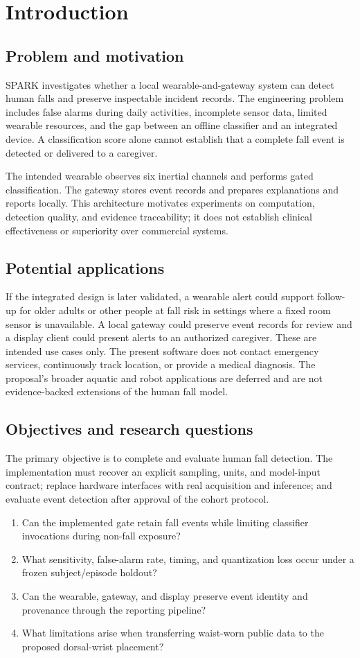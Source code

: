 \chapter{Introduction}
\section{Problem and motivation}
SPARK investigates whether a local wearable-and-gateway system can detect human falls and preserve inspectable incident records. The engineering problem includes false alarms during daily activities, incomplete sensor data, limited wearable resources, and the gap between an offline classifier and an integrated device. A classification score alone cannot establish that a complete fall event is detected or delivered to a caregiver.

The intended wearable observes six inertial channels and performs gated classification. The gateway stores event records and prepares explanations and reports locally. This architecture motivates experiments on computation, detection quality, and evidence traceability; it does not establish clinical effectiveness or superiority over commercial systems.

\section{Potential applications}
If the integrated design is later validated, a wearable alert could support follow-up for older adults or other people at fall risk in settings where a fixed room sensor is unavailable. A local gateway could preserve event records for review and a display client could present alerts to an authorized caregiver. These are intended use cases only. The present software does not contact emergency services, continuously track location, or provide a medical diagnosis. The proposal's broader aquatic and robot applications are deferred and are not evidence-backed extensions of the human fall model.

\section{Objectives and research questions}
The primary objective is to complete and evaluate human fall detection. The implementation must recover an explicit sampling, units, and model-input contract; replace hardware interfaces with real acquisition and inference; and evaluate event detection after approval of the cohort protocol.
\begin{enumerate}
\item Can the implemented gate retain fall events while limiting classifier invocations during non-fall exposure?
\item What sensitivity, false-alarm rate, timing, and quantization loss occur under a frozen subject/episode holdout?
\item Can the wearable, gateway, and display preserve event identity and provenance through the reporting pipeline?
\item What limitations arise when transferring waist-worn public data to the proposed dorsal-wrist placement?
\end{enumerate}

